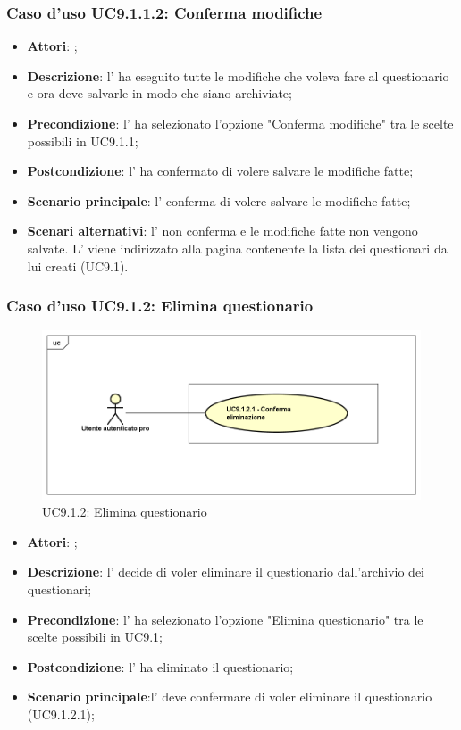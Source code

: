 					\subsubsection{Caso d'uso UC9.1.1.2: Conferma modifiche}
					\label{UC9.1.1.2}
					\begin{itemize}
						\item \textbf{Attori}: \uaupro{};
						\item \textbf{Descrizione}: l'\uaupro{} ha eseguito tutte le modifiche che voleva fare al questionario e ora deve salvarle in modo che siano archiviate;
						\item \textbf{Precondizione}: l'\uaupro{} ha selezionato l'opzione "Conferma modifiche" tra le scelte possibili in UC9.1.1;
						\item \textbf{Postcondizione}: l'\uaupro{} ha confermato di volere salvare le modifiche fatte;
						\item \textbf{Scenario principale}: l'\uaupro{} conferma di volere salvare le modifiche fatte;
						\item \textbf{Scenari alternativi}: l'\uaupro{} non conferma e le modifiche fatte non vengono salvate. L'\uaupro{} viene indirizzato alla pagina contenente la lista dei questionari da lui creati (UC9.1).
					\end{itemize}
										
			\subsubsection{Caso d'uso UC9.1.2: Elimina questionario}
			\label{UC9.1.2}
			\begin{figure}[h]
				\centering
			\includegraphics[scale=0.5,keepaspectratio]{UML/UC9_1_2.png}
				\caption{UC9.1.2: Elimina questionario}
			\end{figure}
			\FloatBarrier
			\begin{itemize}
				\item \textbf{Attori}: \uaupro{};
				\item \textbf{Descrizione}: l'\uaupro{} decide di voler eliminare il questionario dall'archivio dei questionari;
				\item \textbf{Precondizione}: l'\uaupro{} ha selezionato l'opzione "Elimina questionario" tra le scelte possibili in UC9.1;
				\item \textbf{Postcondizione}: l'\uaupro{} ha eliminato il questionario;
				\item \textbf{Scenario principale}:l'\uaupro{} deve confermare di voler eliminare il questionario (UC9.1.2.1);
			\end{itemize}
			

